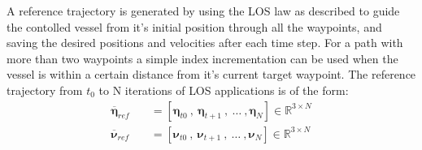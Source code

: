 A reference trajectory is generated by using the LOS law as described to guide the contolled vessel from it's initial position through all the waypoints, and
saving the desired positions and velocities after each time step. For a path with more than two waypoints a simple index incrementation can be used when the
vessel is within a certain distance from it's current target waypoint. The reference trajectory from $t_0$ to N iterations of \gls{LOS} applications is of the form:
\begin{subequations}
    \begin{align}
        \overline{\bm{\eta}}_{ref} \quad & = [\bm{\eta}_{t0} \ , \ \bm{\eta}_{t+1} \ , \ \dots \ , \bm{\eta}_N] \in \mathbb{R}^{3 \times N} \\ 
        \overline{\bm{\nu}}_{ref} \quad & = [\bm{\nu}_{t0} \ , \ \bm{\nu}_{t+1} \ , \ \dots \ , \bm{\nu}_N] \in \mathbb{R}^{3 \times N}
    \end{align}
\end{subequations}

